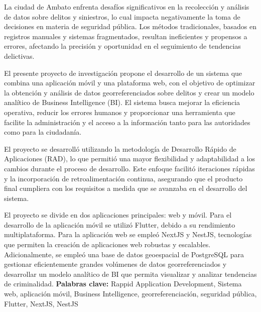 La ciudad de Ambato enfrenta desafíos significativos en la recolección y análisis de datos sobre
delitos y siniestros, lo cual impacta negativamente la toma de decisiones en materia de seguridad
pública. Los métodos tradicionales, basados en registros manuales y sistemas fragmentados, resultan
ineficientes y propensos a errores, afectando la precisión y oportunidad en el seguimiento de
tendencias delictivas.
\bigbreak

El presente proyecto de investigación propone el desarrollo de un sistema que combina una aplicación
móvil y una plataforma web, con el objetivo de optimizar la obtención y análisis de datos georreferenciados
sobre delitos y crear un modelo analítico de Business Intelligence (BI). El sistema busca mejorar
la eficiencia operativa, reducir los errores humanos y proporcionar una herramienta que facilite la
administración y el acceso a la información tanto para las autoridades como para la ciudadanía.
\bigbreak

El proyecto se desarrolló utilizando la metodología de Desarrollo Rápido de Aplicaciones (RAD),
lo que permitió una mayor flexibilidad y adaptabilidad a los cambios durante el proceso de desarrollo.
Este enfoque facilitó iteraciones rápidas y la incorporación de retroalimentación continua, asegurando
que el producto final cumpliera con los requisitos a medida que se avanzaba en el desarrollo del sistema.
\bigbreak

El proyecto se divide en dos aplicaciones principales: web y móvil. Para el desarrollo de la aplicación
móvil se utilizó Flutter, debido a su rendimiento multiplataforma. Para la aplicación web se empleó
NextJS y NestJS, tecnologías que permiten la creación de aplicaciones web robustas y escalables.
Adicionalmente, se empleó una base de datos geoespacial de PostgreSQL para gestionar eficientemente
grandes volúmenes  de datos georreferenciados y desarrollar un modelo analítico de BI que permita
visualizar y analizar tendencias de criminalidad.
\vfill
\textbf{Palabras clave:} Rappid Application Development, Sistema web, aplicación móvil, Business Intelligence,
georreferenciación, seguridad pública, Flutter, NextJS, NestJS
